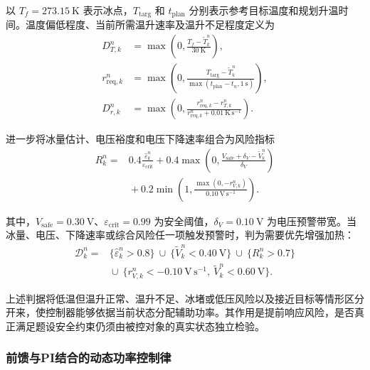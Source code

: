 以 $T_f=273.15\ \mathrm K$ 表示冰点，$T_{\mathrm{targ}}$ 和 $t_{\mathrm{plan}}$ 分别表示参考目标温度和规划升温时间。温度偏低程度、当前所需温升速率及温升不足程度定义为
\begin{equation}
\begin{aligned}
D_{T,k}^n&=\max\!\left(0,\frac{T_f-\widetilde T_k^n}{30\ \mathrm K}\right),\\
r_{\mathrm{req},k}^n&=\max\!\left(0,\frac{T_{\mathrm{targ}}-\widetilde T_k^n}
{\max(t_{\mathrm{plan}}-t_n,1\ \mathrm s)}\right),\\
D_{r,k}^n&=\max\!\left(0,\frac{r_{\mathrm{req},k}^n-r_{T,k}^n}
{r_{\mathrm{req},k}^n+0.01\ \mathrm{K\,s^{-1}}}\right).
\end{aligned}
\tag{7-15}\label{eq:q4:temperature_deficit}
\end{equation}

进一步将冰量估计、电压裕度和电压下降速率组合为风险指标
\begin{equation}
\begin{aligned}
R_k^n={}&0.4\frac{\widehat\varepsilon_k^n}{\varepsilon_{\mathrm{crit}}}
+0.4\max\!\left(0,\frac{V_{\mathrm{safe}}+\delta_V-\widetilde V_k^n}{\delta_V}\right)
\\
&{}+0.2\min\!\left(1,\frac{\max(0,-r_{V,k}^n)}{0.10\ \mathrm{V\,s^{-1}}}\right).
\end{aligned}
\tag{7-16}\label{eq:q4:ice_risk}
\end{equation}

其中，$V_{\mathrm{safe}}=0.30\ \mathrm V$、$\varepsilon_{\mathrm{crit}}=0.99$ 为安全阈值，$\delta_V=0.10\ \mathrm V$ 为电压预警带宽。当冰量、电压、下降速率或综合风险任一项触发预警时，判为需要优先增强加热：
\begin{equation}
\begin{aligned}
\mathcal D_k^n={}&
\big\{\widehat\varepsilon_k^n>0.8\big\}
\ \cup\ \big\{\widetilde V_k^n<0.40\ \mathrm V\big\}
\ \cup\ \big\{R_k^n>0.7\big\}\\
&{}\cup\ \big\{r_{V,k}^n<-0.10\ \mathrm{V\,s^{-1}},\
\widetilde V_k^n<0.60\ \mathrm V\big\}.
\end{aligned}
\tag{7-17}\label{eq:q4:danger_condition}
\end{equation}

上述判据将低温但温升正常、温升不足、冰堵或低压风险以及接近目标等情形区分开来，使控制器能够依据当前状态分配辅助功率。其作用是提前响应风险，是否真正满足题设安全约束仍须由被控对象的真实状态独立检验。

\subsubsection{前馈与PI结合的动态功率控制律}

